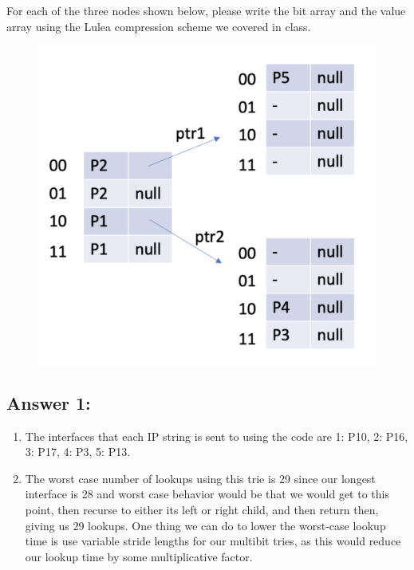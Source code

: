 \documentclass[10pt]{article}
\newenvironment{problem}[2][Problem]{\begin{trivlist}
\item[\hskip \labelsep {\bfseries #1}\hskip \labelsep {\bfseries #2.}]}{\end{trivlist}}
\begin{document}
\begin{problem} {2: Lulea Compression}

For each of the three nodes shown below, please write the bit array and the value array using the Lulea compression scheme we covered in class.

\begin{figure}[h]
    \centering
    \includegraphics[scale=0.5]{figures/trie_nodes.pdf}
    \label{fig:dvp}
\end{figure}

\end{problem}

\subsection*{Answer 1:}
\begin{enumerate}
    \item[(b)] The interfaces that each IP string is sent to using the code are 1: P10, 2: P16, 3: P17, 4: P3, 5: P13.
    \item[(c)] The worst case number of lookups using this trie is 29 since our longest interface is 28 and worst case behavior would be that we would get to this point, then recurse to either its left or right child, and then return then, giving us 29 lookups. One thing we can do to lower the worst-case lookup time is use variable stride lengths for our multibit tries, as this would reduce our lookup time by some multiplicative factor.
\end{enumerate}
\end{document}
